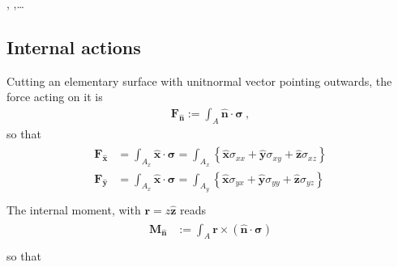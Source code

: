 \documentclass[letterpaper,10pt,english]{jupyterBook}
\begin{document}
\sphinxAtStartPar
{}  , ,…


\subsection{Internal actions}
\label{\detokenize{ch/solids/plates-shells/timoshenko:internal-actions}}\label{\detokenize{ch/solids/plates-shells/timoshenko:solid-mechanics-small-displacements-plates-shells-kirchhoff-internal-actions}}
\sphinxAtStartPar
Cutting an elementary surface with unit\sphinxhyphen{}normal vector pointing outwards, the force acting on it is
\begin{equation*}
\begin{split}\mathbf{F}_{\hat{\mathbf{n}}} := \int_{A} \hat{\mathbf{n}} \cdot \boldsymbol{\sigma} \ , \end{split}
\end{equation*}
\sphinxAtStartPar
so that
\begin{equation*}
\begin{split}\begin{aligned}
  \mathbf{F}_{\hat{\mathbf{x}}} & = \int_{A_x} \hat{\mathbf{x}} \cdot \boldsymbol{\sigma} = \int_{A_x} \left\{ \hat{\mathbf{x}} \sigma_{xx} + \hat{\mathbf{y}} \sigma_{xy} + \hat{\mathbf{z}} \sigma_{xz} \right\} \\
  \mathbf{F}_{\hat{\mathbf{y}}} & = \int_{A_x} \hat{\mathbf{x}} \cdot \boldsymbol{\sigma} = \int_{A_y} \left\{ \hat{\mathbf{x}} \sigma_{yx} + \hat{\mathbf{y}} \sigma_{yy} + \hat{\mathbf{z}} \sigma_{yz} \right\} \\
\end{aligned}\end{split}
\end{equation*}
\sphinxAtStartPar
The internal moment, with \(\mathbf{r} = z \hat{\mathbf{z}}\) reads
\begin{equation*}
\begin{split}\begin{aligned}
  \mathbf{M}_{\hat{\mathbf{n}}} & := \int_{A} \mathbf{r} \times ( \hat{\mathbf{n}} \cdot \boldsymbol\sigma ) \\
\end{aligned}\end{split}
\end{equation*}
\sphinxAtStartPar
so that
\end{document}
